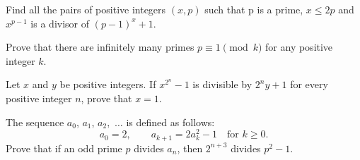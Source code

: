 \documentclass{article}
\begin{document}
\begin{prob}[IMO 1999/4]{6}
Find all the pairs of positive integers $(x,p)$ such that p is a prime, $x \leq 2p$ and $x^{p-1}$ is a divisor of $ (p-1)^{x}+1$.
\end{prob}

\begin{prob}{9}
Prove that there are infinitely many primes $p\equiv 1\pmod{k}$ for any positive integer $k$.
\end{prob}

\begin{prob}[ISL 2012/N6]{9}
Let $x$ and $y$ be positive integers. If ${x^{2^n}}-1$ is divisible by $2^ny+1$ for every positive integer $n$, prove that $x=1$.
\end{prob}

\begin{prob}[ISL 2003/N7]{13}
The sequence $a_0$, $a_1$, $a_2,$ $\ldots$ is defined as follows:
\[a_0=2, \qquad a_{k+1}=2a_k^2-1 \quad\text{for }k \geq 0.\]
Prove that if an odd prime $p$ divides $a_n$, then $2^{n+3}$ divides $p^2-1$.
\end{prob}

\end{document}
